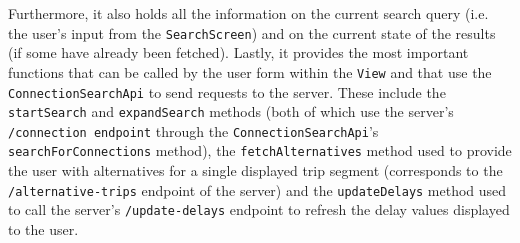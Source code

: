 Furthermore, it also holds all the information on the current search query (i.e. the user's input from the \texttt{SearchScreen}) and on the current state of the results (if some have already been fetched). Lastly, it provides the most important functions that can be called by the user form within the \texttt{View} and that use the \texttt{ConnectionSearchApi} to send requests to the server. These include the \texttt{startSearch} and \texttt{expandSearch} methods (both of which use the server's \texttt{/connection endpoint} through the \texttt{ConnectionSearchApi}'s \texttt{searchForConnections} method), the \texttt{fetchAlternatives} method used to provide the user with alternatives for a single displayed trip segment (corresponds to the \texttt{/alternative-trips} endpoint of the server) and the \texttt{updateDelays} method used to call the server's \texttt{/update-delays} endpoint to refresh the delay values displayed to the user.

